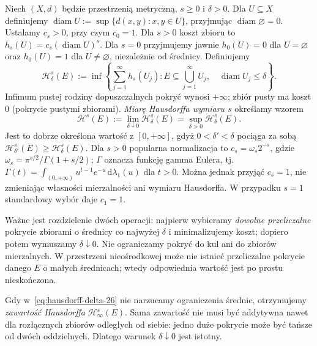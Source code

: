 \begin{definicja}
\label{def:hausdorff-measure-26}
Niech $(X,d)$ będzie przestrzenią metryczną, $s\geq0$
i $\delta>0$. Dla $U\subseteq X$ definiujemy
$\operatorname{diam}U:=\sup\{d(x,y):x,y\in U\}$,
przyjmując $\operatorname{diam}\varnothing=0$.
Ustalamy $c_s>0$, przy czym $c_0=1$.
Dla $s>0$ koszt zbioru to $h_s(U)=c_s(\operatorname{diam}U)^s$.
Dla $s=0$ przyjmujemy jawnie
$h_0(U)=0$ dla $U=\varnothing$ oraz $h_0(U)=1$
dla $U\neq\varnothing$, niezależnie od średnicy.
Definiujemy
\begin{equation}\label{eq:hausdorff-delta-26}
 \mathcal H^s_\delta(E)
 :=\inf\left\{\sum_{j=1}^\infty h_s(U_j):
 E\subseteq\bigcup_{j=1}^\infty U_j,\quad
 \operatorname{diam}U_j\leq\delta\right\}.
\end{equation}
Infimum pustej rodziny dopuszczalnych pokryć wynosi
$+\infty$; zbiór pusty ma koszt $0$ (pokrycie pustymi
zbiorami). \emph{Miarę Hausdorffa wymiaru $s$} określamy
wzorem
\begin{equation}\label{eq:hausdorff-26}
 \mathcal H^s(E):=\lim_{\delta\downarrow0}
 \mathcal H^s_\delta(E)
 =\sup_{\delta>0}\mathcal H^s_\delta(E).
\end{equation}
Jest to dobrze określona wartość z $[0,+\infty]$,
gdyż $0<\delta'<\delta$ pociąga za sobą
$\mathcal H^s_{\delta'}(E)\geq\mathcal H^s_\delta(E)$.
Dla $s>0$ popularna normalizacja to
$c_s=\omega_s2^{-s}$, gdzie
$\omega_s=\pi^{s/2}/\Gamma(1+s/2)$;
$\Gamma$ oznacza funkcję gamma Eulera, tj.
$\Gamma(t)=\int_{(0,+\infty)}u^{t-1}e^{-u}\,\mathrm d\lambda_1(u)$
dla $t>0$. Można jednak przyjąć $c_s=1$, nie zmieniając
własności mierzalności ani wymiaru Hausdorffa.
W przypadku $s=1$ standardowy wybór daje $c_1=1$.
\end{definicja}

Ważne jest rozdzielenie dwóch operacji: najpierw
wybieramy \emph{dowolne przeliczalne} pokrycie zbiorami
o średnicy co najwyżej $\delta$ i minimalizujemy koszt;
dopiero potem wymuszamy $\delta\downarrow0$.
Nie ograniczamy pokryć do kul ani do zbiorów mierzalnych.
W przestrzeni nieośrodkowej może nie istnieć przeliczalne
pokrycie danego $E$ o małych średnicach; wtedy
odpowiednia wartość jest po prostu nieskończona.

\begin{uwaga}
Gdy w~\eqref{eq:hausdorff-delta-26} nie narzucamy
ograniczenia średnic, otrzymujemy \emph{zawartość
Hausdorffa} $\mathcal H^s_\infty(E)$. Sama zawartość
nie musi być addytywna nawet dla rozłącznych
zbiorów odległych od siebie: jedno duże pokrycie
może być tańsze od dwóch oddzielnych.
Dlatego warunek $\delta\downarrow0$ jest istotny.
\end{uwaga}

